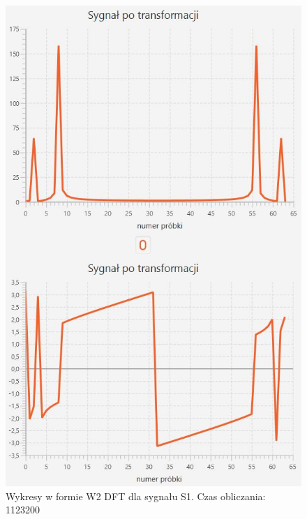 \documentclass[12pt]{article}
\begin{document}
\begin{figure}[H]
	\centering
	\includegraphics[width=.8\linewidth]{DFT-S1-W2}
	\caption{Wykresy w formie W2 DFT dla sygnału S1. Czas obliczania: 1123200}
	\label{S3_sygnal}
\end{figure}
\end{document}
